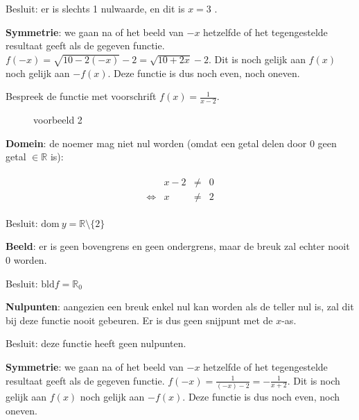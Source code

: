 \begin{voorbeeld}
Besluit: er is slechts 1 nulwaarde, en dit is $x=3$ .




\textbf{Symmetrie}: we gaan na of het beeld van $-x$ hetzelfde
of het tegengestelde resultaat geeft als de gegeven functie. $f(-x)=\sqrt{10-2(-x)}-2=\sqrt{10+2x}-2$.
Dit is noch gelijk aan $f(x)$ noch gelijk aan $-f(x)$. Deze functie
is dus noch even, noch oneven.

\end{voorbeeld}

\begin{voorbeeld}
	Bespreek de functie met voorschrift $f(x)=\frac{1}{x-2}$.



\begin{figure}
	\centering          
	
	\caption{voorbeeld 2}
	\label{fig:reele_functies_vb2}	
\end{figure}




\textbf{Domein}: de noemer mag niet nul worden (omdat een
getal delen door $0$ geen getal $\in \mathbb{R}$ is):


\begin{eqnarray*}
	\begin{array}{cccc}
		& x-2 & \neq & 0\\
		\iff & x & \neq & 2
	\end{array}
\end{eqnarray*}


Besluit: $\textrm{dom}\:y=\mathbb{R}\setminus\{2\}$ 




\textbf{Beeld}: er is geen bovengrens en geen ondergrens,
maar de breuk zal echter nooit $0$ worden.

Besluit: $\textrm{bld}f=\mathbb{R}_{0}$




\textbf{Nulpunten}: aangezien een breuk enkel nul kan worden
als de teller nul is, zal dit bij deze functie nooit gebeuren. Er
is dus geen snijpunt met de $x$-as.

Besluit: deze functie heeft geen nulpunten.




\textbf{Symmetrie}: we gaan na of het beeld van $-x$ hetzelfde
of het tegengestelde resultaat geeft als de gegeven functie. $f(-x)=\frac{1}{(-x)-2}=-\frac{1}{x+2}$.
Dit is noch gelijk aan $f(x)$ noch gelijk aan $-f(x)$. Deze functie
is dus noch even, noch oneven.

\end{voorbeeld}

